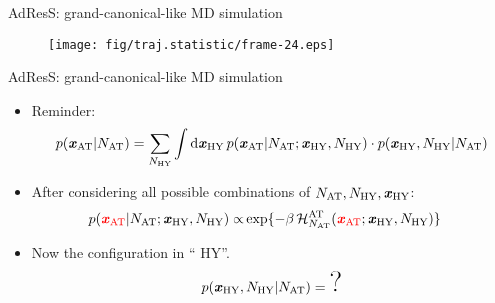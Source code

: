 \documentclass[]{beamer}
\newcommand{\redc}[1]{{\color{red} #1}}
\newcommand{\bluec}[1]{{\color{blue} #1}}
\newcommand{\vect}[1]{\textbf{\textit{#1}}}
\newcommand{\AT}{{\textrm{{AT}}}}
\newcommand{\EX}{{\textrm{AT}}}
\newcommand{\HY}{{\textrm{HY}}}
\begin{document}
\begin{frame}{AdResS: grand-canonical-like MD simulation}
  \addtocounter{framenumber}{-1}
  \begin{minipage}[t][8cm][t]{1.0\linewidth}
    \begin{figure}[t]
      \centering
      \texttt{[image: fig/traj.statistic/frame-24.eps]}
    \end{figure}
  \end{minipage}
\end{frame}

\begin{frame}{AdResS: grand-canonical-like MD simulation}
  \begin{itemize}
  \item <1-> Reminder:
    \bluec{
      \begin{align*}
        p(\vect x_\AT \vert N_\AT) =
        \sum_{N_\HY} \int \textrm{d}\vect x_\HY\,
        p(\vect x_\AT \vert N_\AT; \vect x_\HY, N_\HY)\cdot
        p(\vect x_\HY, N_\HY\vert N_\AT)
      \end{align*}
      }
  \item <1-> After considering all possible combinations of
    \bluec{$N_\AT, N_\HY, \vect x_\HY$}:
    \bluec{
      \begin{align*}
        p(\redc{\vect x_\AT} \vert N_\AT; \vect x_\HY, N_\HY) \propto&
        \exp\{-\beta\, \mathcal H^\EX_{N_\AT}(\redc{\vect x_\AT}; \vect x_\HY, N_\HY)\}
      \end{align*}
    }
  \item <2-> Now the configuration in ``\bluec{$\HY$}''.
    \bluec{
      \begin{align*}
        p(\vect x_\HY, N_\HY\vert N_\AT) = \textrm{\huge{?}}
      \end{align*}
    }
  \end{itemize}
\end{frame}
\end{document}
